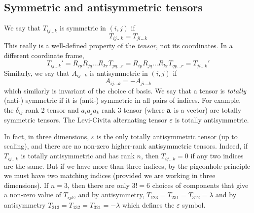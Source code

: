\subsection{Symmetric and antisymmetric tensors}
We say that \(T_{ij\dots k}\) is symmetric in \((i, j)\) if
\[
	T_{ij\dots k} = T_{ji\dots k}
\]
This really is a well-defined property of the \textit{tensor}, not its coordinates.
In a different coordinate frame,
\[
	T_{ij\dots k}' = R_{ip}R_{jq}\dots R_{kr} T_{pq\dots r} = R_{ip}R_{jq}\dots R_{kr} T_{qp\dots r} = T_{ji\dots k}'
\]
Similarly, we say that \(A_{ij\dots k}\) is antisymmetric in \((i, j)\) if
\[
	A_{ij\dots k} = -A_{ji\dots k}
\]
which similarly is invariant of the choice of basis.
We say that a tensor is \textit{totally} (anti-) symmetric if it is (anti-) symmetric in all pairs of indices.
For example, the \(\delta_{ij}\) rank 2 tensor and \(a_i a_j a_k\) rank 3 tensor (where \(\vb a\) is a vector) are totally symmetric tensors.
The Levi-Civita alternating tensor \(\varepsilon\) is totally antisymmetric.

In fact, in three dimensions, \(\varepsilon\) is the only totally antisymmetric tensor (up to scaling), and there are no non-zero higher-rank antisymmetric tensors.
Indeed, if \(T_{ij\dots k}\) is totally antisymmetric and has rank \(n\), then \(T_{ij\dots k} = 0\) if any two indices are the same.
But if we have more than three indices, by the pigeonhole principle we must have two matching indices (provided we are working in three dimensions).
If \(n=3\), then there are only \(3!
= 6\) choices of components that give a non-zero value of \(T_{ijk}\), and by antisymmetry, \(T_{123} = T_{231} = T_{312} = \lambda\) and by antisymmetry \(T_{213} = T_{132} = T_{321} = -\lambda\) which defines the \(\varepsilon\) symbol.

